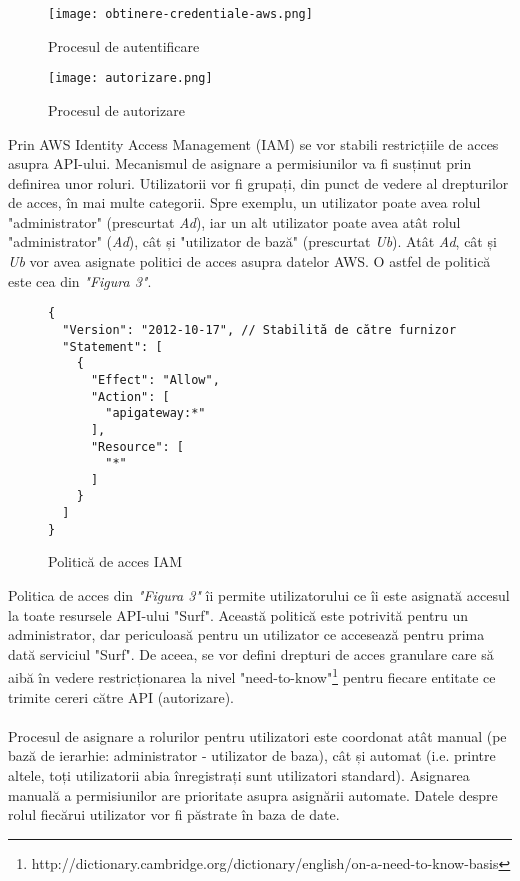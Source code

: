\begin{figure}[ht]
\begin{center}
	\texttt{[image: obtinere-credentiale-aws.png]}
	\caption{Procesul de autentificare \cite{diagram-icons-sources}}\par\medskip
	\vspace{10mm}
	\texttt{[image: autorizare.png]}
	\caption{Procesul de autorizare \cite{diagram-icons-sources}}\par\medskip

\end{center}
\end{figure}

\noindent
Prin AWS Identity Access Management (IAM) se vor stabili restricțiile de acces asupra API-ului. Mecanismul de asignare a permisiunilor va fi susținut prin definirea unor roluri. Utilizatorii vor fi grupați, din punct de vedere al drepturilor de acces, în mai multe categorii. Spre exemplu, un utilizator poate avea rolul "administrator" (prescurtat \emph{Ad}), iar un alt utilizator poate avea atât rolul "administrator" (\emph{Ad}), cât și "utilizator de bază" (prescurtat \emph{Ub}). Atât \emph{Ad}, cât și \emph{Ub} vor avea asignate politici de acces asupra datelor AWS. O astfel de politică este cea din \textit{"Figura 3"}.
\\

\begin{figure}[ht]
\begin{verbatim}
{
  "Version": "2012-10-17", // Stabilită de către furnizor
  "Statement": [
    {
      "Effect": "Allow",
      "Action": [
        "apigateway:*"
      ],
      "Resource": [
        "*"
      ]
    }
  ]
}
\end{verbatim}
\begin{center}
	\caption{Politică de acces IAM}\par\medskip
\end{center}
\end{figure}

\noindent
Politica de acces din \textit{"Figura 3"} îi permite utilizatorului ce îi este asignată accesul la toate resursele API-ului "Surf". Această politică este potrivită pentru un administrator, dar periculoasă pentru un utilizator ce accesează pentru prima dată serviciul "Surf". De aceea, se vor defini drepturi de acces granulare care să aibă în vedere restricționarea la nivel "need-to-know"\footnote{http://dictionary.cambridge.org/dictionary/english/on-a-need-to-know-basis} pentru fiecare entitate ce trimite cereri către API (autorizare).
\\
\\
Procesul de asignare a rolurilor pentru utilizatori este coordonat atât manual (pe bază de ierarhie: administrator - utilizator de baza), cât și automat (i.e. printre altele, toți utilizatorii abia înregistrați sunt utilizatori standard). Asignarea manuală a permisiunilor are prioritate asupra asignării automate. Datele despre rolul fiecărui utilizator vor fi păstrate în baza de date.
\\

